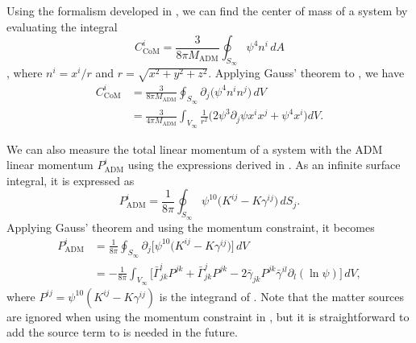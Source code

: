 \documentclass{../document}
\begin{document}
      Using the formalism developed in \cite{Baskaran_2003}, we can find the center of mass of a system by evaluating the integral
      \begin{equation} \label{eq:CoM-surf}
        C_\text{CoM}^i = \frac{3}{8 \pi M_\text{ADM}}
                         \oint_{S_\infty} \psi^4 n^i \, dA
      \end{equation}
      \cite[]{Serguei}, where $n^i = x^i / r$ and $r = \sqrt{x^2 + y^2 + z^2}$. Applying Gauss' theorem to \eq{\eqref{eq:CoM-surf}}, we have
      \begin{align}
        C_\text{CoM}^i
        &= \frac{3}{8 \pi M_\text{ADM}}
            \oint_{S_\infty} \partial_j \Big( \psi^4 n^i n^j \Big) \, dV \label{eq:CoM-Gauss} \\
        &= \frac{3}{4 \pi M_\text{ADM}}
            \int_{V_\infty} \frac{1}{r^2} \Big(
              2 \psi^3 \partial_j \psi x^i x^j
              + \psi^4 x^i
            \Big) dV. \label{eq:CoM-vol}
      \end{align}

      We can also measure the total linear momentum of a system with the ADM linear momentum $P_\text{ADM}^i$ using the expressions derived in \cite[]{Serguei}. As an infinite surface integral, it is expressed as
      \begin{equation} \label{eq:Padm-surf}
        P_\text{ADM}^i = \frac{1}{8\pi}
                          \oint_{S_\infty} \psi^{10} \Big(
                            K^{ij} - K \gamma^{ij}
                           \Big) \, dS_j.
      \end{equation}
      Applying Gauss' theorem and using the momentum constraint, it becomes
      \begin{align}
        P_\text{ADM}^i
        &= \frac{1}{8\pi}
            \oint_{S_\infty} \partial_j \Big[ \psi^{10} \Big(
              K^{ij} - K \gamma^{ij}
            \Big) \Big] \, dV \label{eq:Padm-Gauss} \\
        &= - \frac{1}{8\pi}
              \int_{V_\infty} \Big[
                \bar\Gamma^i_{jk} P^{jk}
                + \bar\Gamma^j_{jk} P^{jk}
                - 2 \bar\gamma_{jk} P^{jk} \bar\gamma^{il}
                                           \partial_l(\ln\psi)
              \Big] \, dV, \label{eq:Padm-vol}
      \end{align}
      where $P^{ij} = \psi^{10} (K^{ij} - K \gamma^{ij})$ is the integrand of \eq{\eqref{eq:Padm-surf}}. Note that the matter sources are ignored when using the momentum constraint in \cite{BaumgarteShapiro}, but it is straightforward to add the source term to \eq{\eqref{eq:Padm-vol}} is needed in the future.
\end{document}
